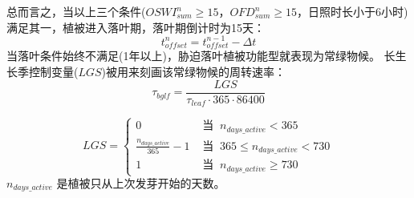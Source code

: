 总而言之，当以上三个条件($OSWI_{sum}^n\geq15$，$OFD_{sum}^n\geq15$，日照时长小于6小时)满足其一，植被进入落叶期，落叶期倒计时为15天：
\begin{equation}
t_{offset}^{n}=t_{offset}^{n-1}-\Delta t
\end{equation}
当落叶条件始终不满足(1年以上)，胁迫落叶植被功能型就表现为常绿物候。
长生长季控制变量($LGS$)被用来刻画该常绿物候的周转速率：
\begin{equation}
\tau_{b g l f}=\frac{L G S}{\tau_{leaf} \cdot 365 \cdot 86400}
\end{equation}

\begin{equation}
L G S=\left\{\begin{array}{cc}0 &  \text{ 当 }\ n_{ {days}\_{active}}<365 \\ 
\frac{n_{ {days\_{active}}}}{365}-1 &  \text{ 当 }\ 365 \leq n_{ {days }\_{active} }<730 \\ 
1 & \text{ 当 }\ n_{ {days}\_{active}} \geq 730
\end{array}\right.
\end{equation}
$n_{days\_{active}}$ 是植被只从上次发芽开始的天数。


